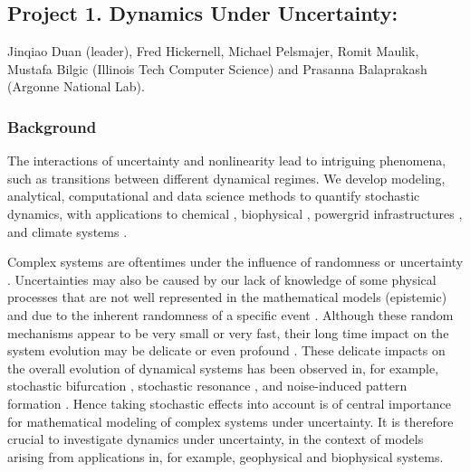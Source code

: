 \documentclass[11pt]{NSFamsart}
\newcommand{\FredNote}[1]{{\color{blue} Fred: #1}}
\begin{document}
\iffalse  
 While there   may be thematic driven differences on the approach to deliver
knowledge and do research, each group share a similar year-round schedule that will allow awareness
and exchange of ideas throughout the academic year, mainly at the RTG graduate seminar.   Finally each summer program is centered on
an intense 2-week period. \FredNote{What does this mean?} Participating undergraduates will have a unique opportunity to work in a serious
way on two topics, which we believe to be highly beneficial.
\fi
 

\subsection*{Project 1. Dynamics  Under Uncertainty:} 
Jinqiao Duan (leader), Fred Hickernell, Michael Pelsmajer, Romit Maulik, Mustafa Bilgic (Illinois Tech Computer Science) and Prasanna Balaprakash (Argonne National Lab). 

\subsubsection*{Background} The interactions of uncertainty and nonlinearity lead to intriguing phenomena, such as  transitions   between  different dynamical regimes. We develop modeling, analytical, computational and data science  methods to quantify     stochastic dynamics, with applications to chemical \cite{agaoglou_chemical_2019}, biophysical \cite{Ruoff2018BiologicalCR}, powergrid infrastructures \cite{MEDJROUBI201714}, and climate systems \cite{Alexandrov2020NonlinearCD, Franzke2017NonlinearAS, Wan2020ADF}. 
 
Complex systems are oftentimes under the influence  of randomness or uncertainty \cite{Moss1, Horst, Gar, VanKampen3}. Uncertainties may also be caused by our lack of knowledge of some physical processes that are not well represented in the mathematical models (epistemic) and due to the inherent randomness of a specific event  \cite{Palmer1, Kantz, Wilks, Williams}.
Although these random mechanisms appear to be very small or very fast, their long time impact on the system evolution may be delicate or even profound \cite{Arnold, DuanBook2015}. These delicate impacts on the overall evolution of dynamical systems has been observed in, for example, stochastic bifurcation
\cite{Crauel, CarLanRob01, Horst}, stochastic resonance \cite{imkeller2002model},
 and  noise-induced pattern formation \cite{Gar, blomker2003pattern}.
Hence taking stochastic effects   into account is of
central importance for mathematical modeling of
complex systems under uncertainty.   It is therefore crucial to investigate dynamics under uncertainty, in the context of models arising from applications in, for example, geophysical and biophysical systems. 
\end{document}
